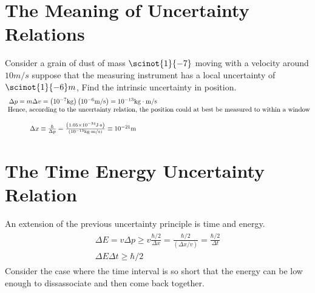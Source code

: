 \section{The Meaning of Uncertainty Relations}
\begin{example}
	Consider a grain of dust of mass $ \scinot{1}{-7} $ moving with a velocity around $ 10 m/s $ suppose that the measuring instrument has a local uncertainty of $ \scinot{1}{-6} m $, Find the intrinsic uncertainty in position. 
	\begin{align*}
	\begin{array} { c } { \Delta p = m \Delta v = \left( 10 ^ { - 7 } \mathrm { kg } \right) \left( 10 ^ { - 6 } \mathrm { m } / \mathrm { s } \right) = 10 ^ { - 13 } \mathrm { kg } \cdot \mathrm { m } / \mathrm { s } } \\ \intertext { Hence, according to the uncertainty relation, the position could at best be measured to within a window}\\ { \Delta x \equiv \frac { \hbar } { \Delta p } = \frac { \left( 1.05 \times 10 ^ { - 34 } \mathrm { J } \cdot \mathrm { s } \right) } { \left( 10 ^ { - 13 } \mathrm { kg } \cdot \mathrm { m } / \mathrm { s } \right) } \equiv 10 ^ { - 21 } \mathrm { m } } \end{array}
	\end{align*}
\end{example}
\section{The Time Energy Uncertainty Relation}
An extension of the previous uncertainty principle is time and energy. \\
\begin{align}
\begin{array} { c } { \Delta E = v \Delta p \geq v \frac { \hbar / 2 } { \Delta x } = \frac { \hbar / 2 } { ( \Delta x / v ) } = \frac { \hbar / 2 } { \Delta t } } \\ { \Delta E \Delta t \geq \hbar / 2 } \end{array}
\end{align}
Consider the case where the time interval is so short that the energy can be low enough to dissassociate and then come back together. 